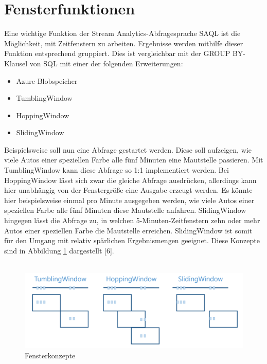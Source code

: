 \section{Fensterfunktionen}
Eine wichtige Funktion der Stream Analytics-Abfragesprache SAQL ist die Möglichkeit, mit Zeitfenstern zu arbeiten. Ergebnisse werden mithilfe dieser Funktion entsprechend gruppiert. Dies ist vergleichbar mit der GROUP BY-Klausel von SQL mit einer der folgenden Erweiterungen:
\begin{itemize}
\item Azure-Blobspeicher 
\item TumblingWindow
\item HoppingWindow
\item SlidingWindow
\end{itemize}
Beispielsweise soll nun eine Abfrage gestartet werden. Diese soll aufzeigen, wie viele Autos einer speziellen Farbe alle fünf Minuten eine Mautstelle passieren. Mit TumblingWindow kann diese Abfrage so 1:1 implementiert werden. Bei HoppingWindow lässt sich zwar die gleiche Abfrage ausdrücken, allerdings kann hier unabhängig von der Fenstergröße eine Ausgabe erzeugt werden. Es könnte hier beispielsweise einmal pro Minute ausgegeben werden, wie viele Autos einer speziellen Farbe alle fünf Minuten diese Mautstelle anfahren. SlidingWindow hingegen lässt die Abfrage zu, in welchen 5-Minuten-Zeitfenstern zehn oder mehr Autos einer speziellen Farbe die Mautstelle erreichen. SlidingWindow ist somit für den Umgang mit relativ spärlichen Ergebnismengen geeignet. Diese Konzepte sind in Abbildung \ref{fig:window_concepts} dargestellt [6].\\ \\

\begin{figure}[h!]
	\centering
	\includegraphics[width=1.0\linewidth]{images/fensterfunktionen}
	\caption{Fensterkonzepte} %
	\label{fig:window_concepts}
\end{figure}
